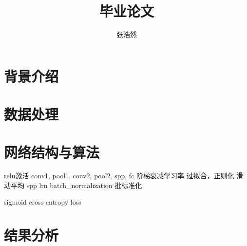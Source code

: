\documentclass{article}
\title{毕业论文}
\author{张浩然}
\date{}
\begin{document}

\maketitle

\section{背景介绍}

\section{数据处理}

\section{网络结构与算法}

relu激活
conv1, pool1, conv2, pool2, spp, fc
阶梯衰减学习率
过拟合，正则化
滑动平均
spp
lrn
batch\_normalization 批标准化

sigmoid cross entropy loss


\cite{name1}

\section{结果分析}




\end{document}
